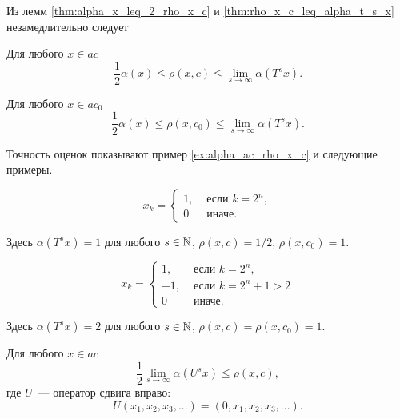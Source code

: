 Из лемм \ref{thm:alpha_x_leq_2_rho_x_c} и \ref{thm:rho_x_c_leq_alpha_t_s_x}
незамедлительно следует
\begin{theorem}
\label{thm:rho_x_c_leq_alpha_t_s_x_united}
	Для любого $x\in ac$
	\begin{equation}
		\frac{1}{2} \alpha(x) \leq \rho(x,c)\leq \lim_{s\to\infty} \alpha(T^s x)
		.
	\end{equation}
\end{theorem}

\begin{corollary}
	Для любого $x\in ac_0$
	\begin{equation}
		\frac{1}{2} \alpha(x) \leq \rho(x,c_0)\leq \lim_{s\to\infty} \alpha(T^s x)
		.
	\end{equation}
\end{corollary}

Точность оценок показывают пример \ref{ex:alpha_ac_rho_x_c} и следующие примеры.
\begin{example}
	\begin{equation}
		x_k = \begin{cases}
			1, &\mbox{~если~} k = 2^n,
			\\
			0 &\mbox{~иначе.}
		\end{cases}
	\end{equation}
\end{example}
Здесь $\alpha(T^s x) = 1$ для любого $s\in\mathbb{N}$, $\rho(x,c) = 1/2$, $\rho(x, c_0) = 1$.

\begin{example}
	\begin{equation}
		x_k = \begin{cases}
			1, &\mbox{~если~} k = 2^n,
			\\
			-1, &\mbox{~если~} k = 2^n + 1 > 2
			\\
			0 &\mbox{~иначе.}
		\end{cases}
	\end{equation}
\end{example}
Здесь $\alpha(T^s x) = 2$ для любого $s\in\mathbb{N}$, $\rho(x,c) = \rho(x, c_0) = 1$.


\begin{hypothesis}
	Для любого $x\in ac$
	\begin{equation}
		\frac{1}{2} \lim_{s\to\infty} \alpha(U^s x) \leq \rho(x,c)
		,
	\end{equation}
	где $U$~--- оператор сдвига вправо:
	\begin{equation}
		U(x_1, x_2, x_3, ...) = (0, x_1, x_2, x_3, ...)
		.
	\end{equation}
\end{hypothesis}
